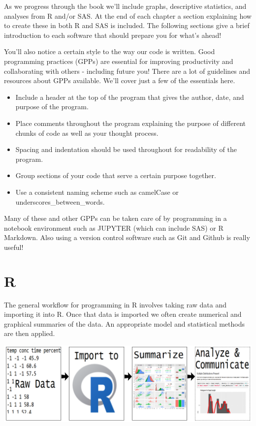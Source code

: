 \documentclass[
]{book}
\theoremstyle{definition}
\theoremstyle{definition}
\theoremstyle{definition}
\theoremstyle{remark}
\begin{document}
As we progress through the book we'll include graphs, descriptive statistics, and analyses from R and/or SAS. At the end of each chapter a section explaining how to create these in both R and SAS is included. The following sections give a brief introduction to each software that should prepare you for what's ahead!

You'll also notice a certain style to the way our code is written. Good programming practices (GPPs) are essential for improving productivity and collaborating with others - including future you! There are a lot of guidelines and resources about GPPs available. We'll cover just a few of the essentials here.

\begin{itemize}
\item
  Include a header at the top of the program that gives the author, date, and purpose of the program.
\item
  Place comments throughout the program explaining the purpose of different chunks of code as well as your thought process.
\item
  Spacing and indentation should be used throughout for readability of the program.
\item
  Group sections of your code that serve a certain purpose together.
\item
  Use a consistent naming scheme such as camelCase or underscores\_between\_words.
\end{itemize}

Many of these and other GPPs can be taken care of by programming in a notebook environment such as JUPYTER (which can include SAS) or R Markdown. Also using a version control software such as Git and Github is really useful!

\hypertarget{r}{%
\section{R}\label{r}}

The general workflow for programming in R involves taking raw data and importing it into R. Once that data is imported we often create numerical and graphical summaries of the data. An appropriate model and statistical methods are then applied.

\begin{center}\includegraphics[width=0.8\linewidth]{img/RWorkFlow} \end{center}
\end{document}
